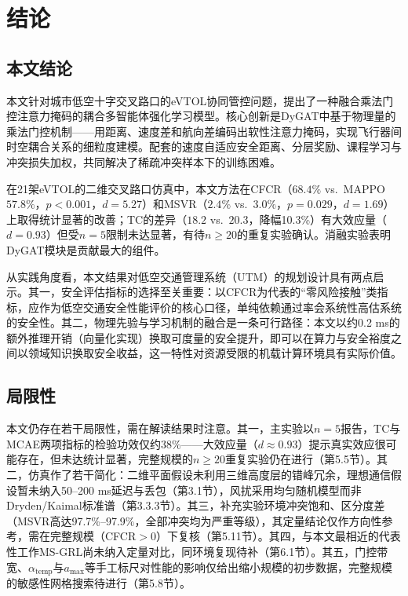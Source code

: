 \documentclass[12pt,a4paper,UTF8]{ctexart}
\begin{document}
\section{结论}

\subsection{本文结论}

本文针对城市低空十字交叉路口的eVTOL协同管控问题，提出了一种融合乘法门控注意力掩码的耦合多智能体强化学习模型。核心创新是DyGAT中基于物理量的乘法门控机制——用距离、速度差和航向差编码出软性注意力掩码，实现飞行器间时空耦合关系的细粒度建模。配套的速度自适应安全距离、分层奖励、课程学习与冲突损失加权，共同解决了稀疏冲突样本下的训练困难。

在21架eVTOL的二维交叉路口仿真中，本文方法在CFCR（$68.4\%$ vs.\ MAPPO $57.8\%$，$p<0.001$，$d=5.27$）和MSVR（$2.4\%$ vs.\ $3.0\%$，$p=0.029$，$d=1.69$）上取得统计显著的改善；TC的差异（$18.2$ vs.\ $20.3$，降幅10.3\%）有大效应量（$d=0.93$）但受$n=5$限制未达显著，有待$n\geq20$的重复实验确认。消融实验表明DyGAT模块是贡献最大的组件。

从实践角度看，本文结果对低空交通管理系统（UTM）的规划设计具有两点启示。其一，安全评估指标的选择至关重要：以CFCR为代表的“零风险接触”类指标，应作为低空交通安全性能评价的核心口径，单纯依赖通过率会系统性高估系统的安全性。其二，物理先验与学习机制的融合是一条可行路径：本文以约0.2 ms的额外推理开销（向量化实现）换取可度量的安全提升，即可以在算力与安全裕度之间以领域知识换取安全收益，这一特性对资源受限的机载计算环境具有实际价值。

\subsection{局限性}

本文仍存在若干局限性，需在解读结果时注意。其一，主实验以$n=5$报告，TC与MCAE两项指标的检验功效仅约38\%——大效应量（$d\approx0.93$）提示真实效应很可能存在，但未达统计显著，完整规模的$n\geq20$重复实验仍在进行（第5.5节）。其二，仿真作了若干简化：二维平面假设未利用三维高度层的错峰冗余，理想通信假设暂未纳入50--200 ms延迟与丢包（第3.1节），风扰采用均匀随机模型而非Dryden/Kaimal标准谱（第3.3.3节）。其三，补充实验环境冲突饱和、区分度差（MSVR高达97.7\%--97.9\%，全部冲突均为严重等级），其定量结论仅作方向性参考，需在完整规模（CFCR$>0$）下复核（第5.11节）。其四，与本文最相近的代表性工作MS-GRL尚未纳入定量对比，同环境复现待补（第6.1节）。其五，门控带宽、$\alpha_{\text{temp}}$与$a_{\max}$等手工标尺对性能的影响仅给出缩小规模的初步数据，完整规模的敏感性网格搜索待进行（第5.8节）。
\end{document}
